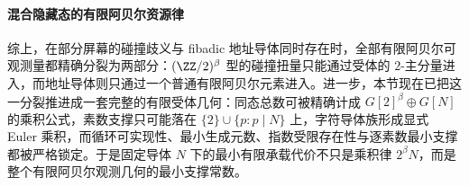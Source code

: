 

\paragraph{混合隐藏态的有限阿贝尔资源律}
综上，在部分屏幕的碰撞歧义与 fibadic 地址导体同时存在时，全部有限阿贝尔可观测量都精确分裂为两部分：\((\ZZ/2)^\beta\) 型的碰撞扭量只能通过受体的 \(2\)-主分量进入，而地址导体则只通过一个普通有限阿贝尔元素进入。进一步，本节现在已把这一分裂推进成一套完整的有限受体几何：同态总数可被精确计成 \(G[2]^\beta\oplus G[N]\) 的乘积公式，素数支撑只可能落在 \(\{2\}\cup\{p:p\mid N\}\) 上，字符导体族形成显式 Euler 乘积，而循环可实现性、最小生成元数、指数受限存在性与逐素数最小支撑都被严格锁定。于是固定导体 \(N\) 下的最小有限承载代价不只是乘积律 \(2^\beta N\)，而是整个有限阿贝尔观测几何的最小支撑常数。

\endinput

